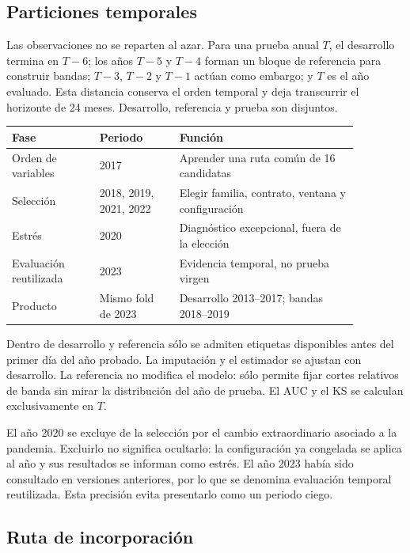 \documentclass[10pt,a4paper]{article}
\newcommand{\DevelopmentPeriod}{2013--2017}
\newcommand{\BandPeriod}{2018--2019}
\begin{document}
\subsection{Particiones temporales}

Las observaciones no se reparten al azar. Para una prueba anual $T$, el
desarrollo termina en $T-6$; los años $T-5$ y $T-4$ forman un bloque de
referencia para construir bandas; $T-3$, $T-2$ y $T-1$ actúan como embargo; y
$T$ es el año evaluado. Esta distancia conserva el orden temporal y deja
transcurrir el horizonte de 24 meses. Desarrollo, referencia y prueba son
disjuntos.

\begin{center}\small
\begin{tabular}{p{0.22\linewidth} p{0.20\linewidth} p{0.45\linewidth}}
\textbf{Fase} & \textbf{Periodo} & \textbf{Función}\\ \hline
Orden de variables & 2017 & Aprender una ruta común de 16 candidatas\\
Selección & 2018, 2019, 2021, 2022 & Elegir familia, contrato, ventana y configuración\\
Estrés & 2020 & Diagnóstico excepcional, fuera de la elección\\
Evaluación reutilizada & 2023 & Evidencia temporal, no prueba virgen\\
Producto & Mismo fold de 2023 & Desarrollo \DevelopmentPeriod{}; bandas \BandPeriod{}\\
\end{tabular}
\end{center}

Dentro de desarrollo y referencia sólo se admiten etiquetas disponibles antes
del primer día del año probado. La imputación y el estimador se ajustan con
desarrollo. La referencia no modifica el modelo: sólo permite fijar cortes
relativos de banda sin mirar la distribución del año de prueba. El AUC y el KS
se calculan exclusivamente en $T$.

El año 2020 se excluye de la selección por el cambio extraordinario asociado a
la pandemia. Excluirlo no significa ocultarlo: la configuración ya congelada se
aplica al año y sus resultados se informan como estrés. El año 2023 había sido
consultado en versiones anteriores, por lo que se denomina evaluación temporal
reutilizada. Esta precisión evita presentarlo como un periodo ciego.

\subsection{Ruta de incorporación}
\end{document}
